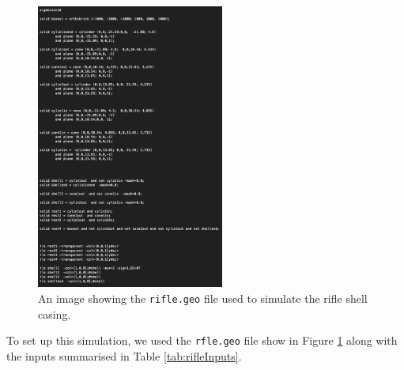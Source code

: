 \begin{figure}[H]
\begin{center}
\includegraphics[width=0.55\textwidth]{Figures/rifleInput.png}
\caption{An image showing the \texttt{rifle.geo} file used to simulate the rifle shell casing.}\label{fig:rifle.geo}
\end{center}
\end{figure}
\noindent
To set up this simulation, we used the \texttt{rfle.geo} file show in Figure \ref{fig:rifle.geo} along with the inputs summarised in Table \ref{tab:rifleInputs}.
